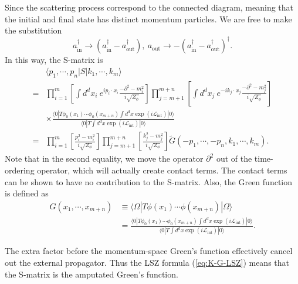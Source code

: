 Since the scattering process correspond to the connected diagram, meaning that the initial and final state has distinct momentum particles.
We are free to make the substitution
\begin{equation*}
	a^\dagger_{\mathrm{in}} \rightarrow (a_{\mathrm{in}}^\dagger - a_{\mathrm{out}}^\dagger),\ 
	a_{\mathrm{out}} \rightarrow -(a_{\mathrm{in}}^\dagger - a_{\mathrm{out}}^\dagger)^\dagger.
\end{equation*}
In this way, the S-matrix is
\begin{equation*}
\begin{aligned}
	& \langle p_1, \cdots, p_n| S |k_1, \cdots, k_m\rangle  \\
	=& \prod_{i=1}^{m}\left[ \int d^dx_i \ e^{ip_i\cdot x_i}\frac{-\partial^2-m_i^2}{i\sqrt{Z_\phi}}\right]
	\prod_{j=m+1}^{m+n}\left[\int d^dx_j \ e^{-ik_j\cdot x_j}\frac{-\partial^2-m_j^2}{i\sqrt{Z_\phi}}\right] \\
	& \times \frac{\langle 0| T \phi_0(x_1)\cdots \phi_0(x_{m+n}) \int d^dx \exp(i\mathcal{L}_{\mathrm{int}})|0\rangle}
		{\langle 0|T\int d^dx \exp(i\mathcal{L}_{\mathrm{int}})|0\rangle} \\
	=& \prod_{i=1}^{m}\left[\frac{p_i^2-m_i^2}{i\sqrt{Z_\phi}}\right]
		\prod_{j=m+1}^{m+n}\left[\frac{k_j^2-m_j^2}{i\sqrt{Z_\phi}}\right]
		\tilde{G}(-p_1,\cdots,-p_n,k_1,\cdots,k_m).
	\label{eq:K-G-LSZ}
\end{aligned}
\end{equation*}
Note that in the second equality, we move the operator $\partial^2$ out of the time-ordering operator, which will actually create contact terms.
The contact terms can be shown to have no contribution to the S-matrix.
Also, the Green function is defined as
\begin{equation*}
\begin{aligned}
	G(x_1,\cdots,x_{m+n}) 
	&\equiv \langle \Omega|T \phi(x_1)\cdots \phi(x_{m+n})|\Omega\rangle \\
	&= \frac{\langle 0| T \phi_0(x_1)\cdots \phi_0(x_{m+n}) \int d^dx \exp(i\mathcal{L}_{\mathrm{int}})|0\rangle}
		{\langle 0|T\int d^dx \exp(i\mathcal{L}_{\mathrm{int}})|0\rangle}.
\end{aligned}
\end{equation*}

The extra factor before the momentum-space Green's function effectively cancel out the external propagator. 
Thus the LSZ formula (\ref{eq:K-G-LSZ}) means that the S-matrix is the amputated Green's function.


